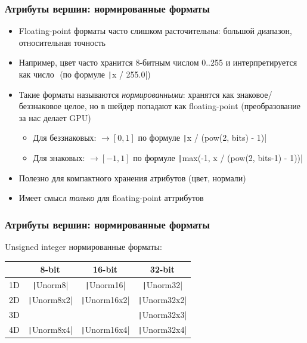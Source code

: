 \documentclass[10pt]{beamer}
\begin{document}
\begin{frame}[fragile]
\frametitle{Атрибуты вершин: нормированные форматы}
\begin{itemize}
\item Floating-point форматы часто слишком расточительны: большой диапазон, относительная точность
\pause
\item Например, цвет часто хранится 8-битным числом 0..255 и интерпретируется как число \begin{math}[0, 1]\end{math} (по формуле \texttt|x / 255.0|)
\pause
\item Такие форматы называются \textit{нормированными}: хранятся как знаковое/беззнаковое целое, но в шейдер попадают как floating-point (преобразование за нас делает GPU)
\pause
\begin{itemize}
\item Для беззнаковых: \begin{math}[0, 2^{bits}-1] \rightarrow [0, 1]\end{math} по формуле \texttt|x / (pow(2, bits) - 1)|
\pause
\item Для знаковых: \begin{math}[-2^{bits-1}, 2^{bits-1}-1] \rightarrow [-1, 1]\end{math} по формуле \texttt|max(-1, x / (pow(2, bits-1) - 1))|
\end{itemize}
\pause
\item Полезно для компактного хранения атрибутов (цвет, нормали)
\pause
\item Имеет смысл \textit{только} для floating-point аттрибутов
\end{itemize}
\end{frame}

\begin{frame}[fragile]
\frametitle{Атрибуты вершин: нормированные форматы}
Unsigned integer нормированные форматы:
\begin{center}
\begin{tabular}{ |c|c|c|c| } 
\hline
 & 8-bit & 16-bit & 32-bit \\ 
\hline
1D & \texttt|Unorm8| & \texttt|Unorm16| & \texttt|Unorm32| \\ 
\hline
2D & \texttt|Unorm8x2| & \texttt|Unorm16x2| & \texttt|Unorm32x2| \\ 
\hline
3D & & & \texttt|Unorm32x3| \\ 
\hline
4D & \texttt|Unorm8x4| & \texttt|Unorm16x4| & \texttt|Unorm32x4| \\ 
\hline
\end{tabular}
\end{center}
\end{frame}
\end{document}
